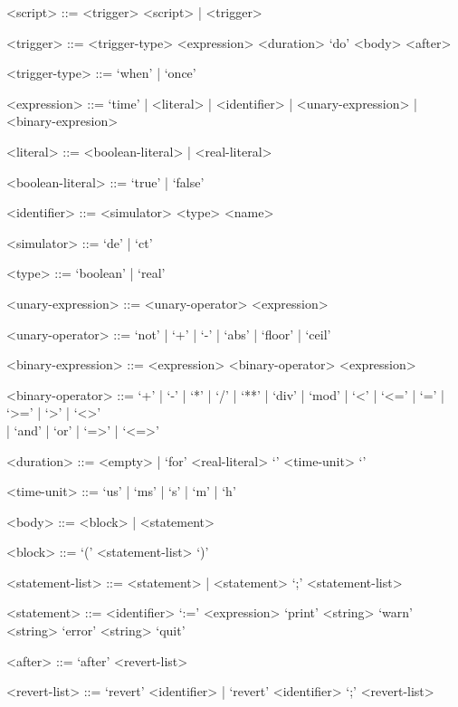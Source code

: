 \documentclass{crescendorepchap}
\begin{document}
\begin{grammar}
<script> ::= <trigger> <script> | <trigger>

<trigger> ::= <trigger-type> <expression> <duration> `do' <body> <after>

<trigger-type> ::= `when' | `once'

<expression> ::= `time' | <literal> | <identifier> | <unary-expression> | <binary-expresion>

<literal> ::= <boolean-literal> | <real-literal>

<boolean-literal> ::= `true' | `false'

<identifier> ::= <simulator> <type> <name>

<simulator> ::= `de' | `ct'

<type> ::= `boolean' | `real'

<unary-expression> ::= <unary-operator> <expression>

<unary-operator> ::= `not' | `+' | `-' | `abs' | `floor' | `ceil'

<binary-expression> ::= <expression> <binary-operator> <expression>

<binary-operator> ::= `+' | `-' | `*' | `/' | `**' | `div' | `mod' | `<' | `<=' | `=' | `>=' | `>' | `<>' \\| `and' | `or' | `=>' | `<=>'

<duration> ::= <empty> | `for' <real-literal> `{' <time-unit> `}'

<time-unit> ::= `us' | `ms' | `s' | `m' | `h'

<body> ::= <block> | <statement>

<block> ::= `(' <statement-list> `)'

<statement-list> ::= <statement> | <statement> `;' <statement-list>

<statement> ::= <identifier> `:=' <expression>
   \alt `print' <string>
   \alt `warn' <string>
   \alt `error' <string>
   \alt `quit'

<after> ::= `after' <revert-list>

<revert-list> ::= `revert' <identifier> | `revert' <identifier> `;' <revert-list>
\end{grammar}


\end{document}
